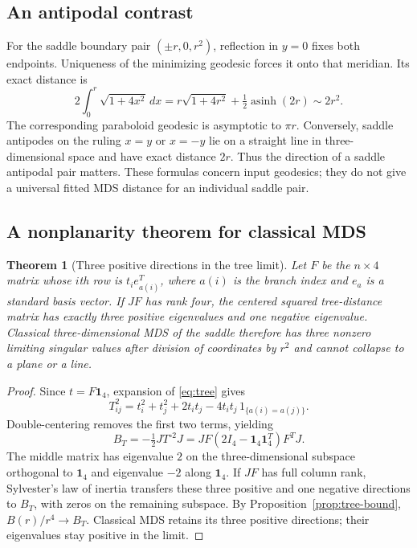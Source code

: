\documentclass[11pt]{article}
\newtheorem{theorem}[proposition]{Theorem}
\theoremstyle{remark}\newtheorem{remark}[proposition]{Remark}
\newcommand{\one}{\mathbf 1}
\newcommand{\asinh}{\operatorname{asinh}}
\begin{document}
\subsection{An antipodal contrast}
For the saddle boundary pair $(\pm r,0,r^2)$, reflection in $y=0$ fixes both
endpoints. Uniqueness of the minimizing geodesic forces it onto that meridian.
Its exact distance is
\begin{equation}\label{eq:saddle-antipodal}
 2\int_0^r\sqrt{1+4x^2}\,dx
 =r\sqrt{1+4r^2}+\tfrac12\asinh(2r)\sim2r^2.
\end{equation}
The corresponding paraboloid geodesic is asymptotic to $\pi r$. Conversely,
saddle antipodes on the ruling $x=y$ or $x=-y$ lie on a straight line in
three-dimensional space and have exact distance $2r$. Thus the direction
of a saddle antipodal pair matters. These formulas concern input geodesics;
they do not give a universal fitted MDS distance for an individual saddle pair.

\subsection{A nonplanarity theorem for classical MDS}
\begin{theorem}[Three positive directions in the tree limit]\label{thm:tree-rank}
Let $F$ be the $n\times4$ matrix whose $i$th row is $t_i e_{a(i)}^T$, where
$a(i)$ is the branch index and $e_a$ is a standard basis vector. If $JF$ has
rank four, the centered squared tree-distance matrix has exactly three
positive eigenvalues and one negative eigenvalue. Classical three-dimensional
MDS of the saddle therefore has three nonzero limiting singular values after
division of coordinates by $r^2$ and cannot collapse to a plane or a line.
\end{theorem}
\begin{proof}
Since $t=F\one_4$, expansion of \eqref{eq:tree} gives
\begin{equation}
 T_{ij}^2=t_i^2+t_j^2+2t_it_j-4t_it_j\,1_{\{a(i)=a(j)\}}.
\end{equation}
Double-centering removes the first two terms, yielding
\begin{equation}\label{eq:tree-gram}
 B_T=-\tfrac12JT^{\circ2}J
     =JF(2I_4-\one_4\one_4^T)F^TJ.
\end{equation}
The middle matrix has eigenvalue $2$ on the three-dimensional subspace
orthogonal to $\one_4$ and eigenvalue $-2$ along $\one_4$. If $JF$ has full
column rank, Sylvester's law of inertia transfers these three positive and
one negative directions to $B_T$, with zeros on the remaining subspace.
By Proposition~\ref{prop:tree-bound}, $B(r)/r^4\to B_T$. Classical MDS retains
its three positive directions; their eigenvalues stay positive in the limit.
\end{proof}
\end{document}
